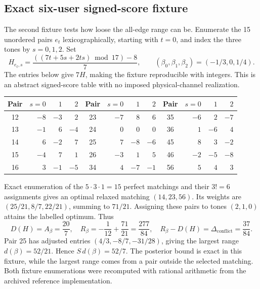 \documentclass[10pt,letterpaper]{article}
\begin{document}
\subsection{Exact six-user signed-score fixture}
The second fixture tests how loose the all-edge range can be. Enumerate the 15 unordered pairs $e_t$ lexicographically, starting with $t=0$, and index the three tones by $s=0,1,2$. Set
\begin{equation}
 H_{e_t,s}=\frac{((7t+5s+2ts)\bmod17)-8}{7},
 \qquad (\beta_0,\beta_1,\beta_2)=(-1/3,0,1/4).
 \label{supp:six-user-table}
\end{equation}
The entries below give $7H$, making the fixture reproducible with integers. This is an abstract signed-score table with no imposed physical-channel realization.
\begin{center}
\setlength{\tabcolsep}{8pt}
\begin{tabular}{c|rrr@{\qquad}c|rrr@{\qquad}c|rrr}
Pair & $s=0$ & $1$ & $2$ & Pair & $s=0$ & $1$ & $2$ & Pair & $s=0$ & $1$ & $2$\\ \hline
12 & $-8$ & $-3$ & $2$ & 23 & $-7$ & $8$ & $6$ & 35 & $-6$ & $2$ & $-7$\\
13 & $-1$ & $6$ & $-4$ & 24 & $0$ & $0$ & $0$ & 36 & $1$ & $-6$ & $4$\\
14 & $6$ & $-2$ & $7$ & 25 & $7$ & $-8$ & $-6$ & 45 & $8$ & $3$ & $-2$\\
15 & $-4$ & $7$ & $1$ & 26 & $-3$ & $1$ & $5$ & 46 & $-2$ & $-5$ & $-8$\\
16 & $3$ & $-1$ & $-5$ & 34 & $4$ & $-7$ & $-1$ & 56 & $5$ & $4$ & $3$
\end{tabular}
\end{center}
Exact enumeration of the $5\cdot3\cdot1=15$ perfect matchings and their $3!=6$ assignments gives an optimal relaxed matching $(14,23,56)$. Its weights are $(25/21,8/7,22/21)$, summing to $71/21$. Assigning these pairs to tones $(2,1,0)$ attains the labelled optimum. Thus
\begin{equation}
 D(H)=A_\beta=\frac{20}{7},\quad
 R_\beta=-\frac1{12}+\frac{71}{21}=\frac{277}{84},\quad
 R_\beta-D(H)=\Delta_{\mathrm{conflict}}=\frac{37}{84}.
 \label{supp:six-user-values}
\end{equation}
Pair 25 has adjusted entries $(4/3,-8/7,-31/28)$, giving the largest range $d(\beta)=52/21$. Hence $S\,d(\beta)=52/7$. The posterior bound is exact in this fixture, while the largest range comes from a pair outside the selected matching. Both fixture enumerations were recomputed with rational arithmetic from the archived reference implementation.
\end{document}
